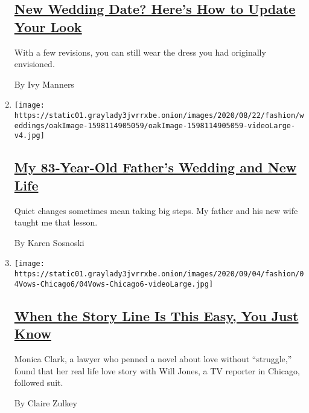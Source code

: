 \begin{enumerate}
  \hypertarget{new-wedding-date-heres-how-to-update-your-look}{%
  \subsection{\texorpdfstring{\href{/2020/09/09/fashion/weddings/new-wedding-date-heres-how-to-update-your-look.html}{New
  Wedding Date? Here's How to Update Your
  Look}}{New Wedding Date? Here's How to Update Your Look}}\label{new-wedding-date-heres-how-to-update-your-look}}

  With a few revisions, you can still wear the dress you had originally
  envisioned.

  By Ivy Manners
\item
  \texttt{[image: https://static01.graylady3jvrrxbe.onion/images/2020/08/22/fashion/weddings/oakImage-1598114905059/oakImage-1598114905059-videoLarge-v4.jpg]}

  \hypertarget{my-83-year-old-fathers-wedding-and-new-life}{%
  \subsection{\texorpdfstring{\href{/2020/09/08/fashion/weddings/my-83-year-old-fathers-wedding-and-new-life.html}{My
  83-Year-Old Father's Wedding and New
  Life}}{My 83-Year-Old Father's Wedding and New Life}}\label{my-83-year-old-fathers-wedding-and-new-life}}

  Quiet changes sometimes mean taking big steps. My father and his new
  wife taught me that lesson.

  By Karen Sosnoski
\item
  \texttt{[image: https://static01.graylady3jvrrxbe.onion/images/2020/09/04/fashion/04Vows-Chicago6/04Vows-Chicago6-videoLarge.jpg]}

  \hypertarget{when-the-story-line-is-this-easy-you-just-know}{%
  \subsection{\texorpdfstring{\href{/2020/09/04/fashion/weddings/Chicago-TV-reporter-William-Jones-Marries-Monica-Clark.html}{When
  the Story Line Is This Easy, You Just
  Know}}{When the Story Line Is This Easy, You Just Know}}\label{when-the-story-line-is-this-easy-you-just-know}}

  Monica Clark, a lawyer who penned a novel about love without
  ``struggle,'' found that her real life love story with Will Jones, a
  TV reporter in Chicago, followed suit.

  By Claire Zulkey
\end{enumerate}


